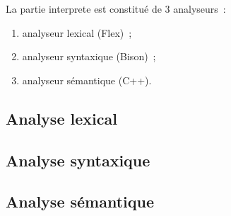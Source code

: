 \begin{frame}
La partie interprete est constitué de 3 analyseurs~:
\begin{enumerate}
\item analyseur lexical (Flex)~;
\item analyseur syntaxique (Bison)~;
\item analyseur sémantique (C++).
\end{enumerate}
\end{frame}

\subsection{Analyse lexical}


\subsection{Analyse syntaxique}


\subsection{Analyse sémantique}

